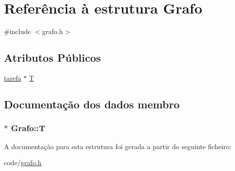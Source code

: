 \hypertarget{structGrafo}{\section{Referência à estrutura Grafo}
\label{structGrafo}
}


{\ttfamily \#include $<$grafo.\-h$>$}

\subsection*{Atributos Públicos}
\begin{DoxyCompactItemize}
\item 
\hyperlink{grafo_8h_ab156210f10bb550f6d61bea964f08c22}{tarefa} $\ast$ \hyperlink{structGrafo_aeb37989f62bb38c1b5ebce8bfa63ad32}{T}
\end{DoxyCompactItemize}


\subsection{Documentação dos dados membro}
\hypertarget{structGrafo_aeb37989f62bb38c1b5ebce8bfa63ad32}{
\subsubsection[{T}]{$\ast$ Grafo\-::\-T}}\label{structGrafo_aeb37989f62bb38c1b5ebce8bfa63ad32}


A documentação para esta estrutura foi gerada a partir do seguinte ficheiro\-:\begin{DoxyCompactItemize}
\item 
code/\hyperlink{grafo_8h}{grafo.\-h}\end{DoxyCompactItemize}
